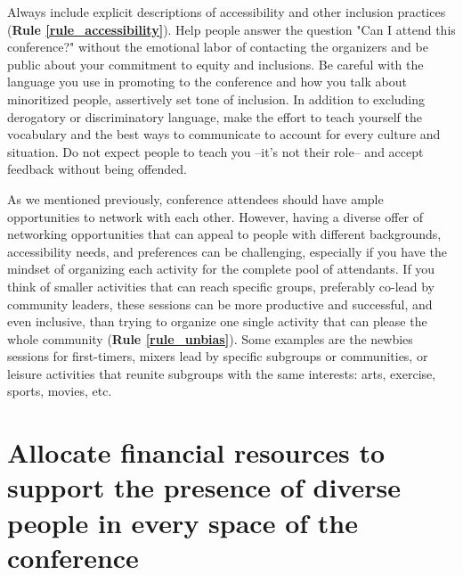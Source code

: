 \documentclass[10pt,letterpaper]{article}
\begin{document}
Always include explicit descriptions of accessibility and other inclusion practices (\textbf{Rule \ref{rule_accessibility}}). Help people answer the question "Can I attend this conference?" without the emotional labor of contacting the organizers and be public about your commitment to equity and inclusions. Be careful with the language you use in promoting to the conference and how you talk about minoritized people, assertively set tone of inclusion. In addition to excluding derogatory or discriminatory language, make the effort to teach yourself the vocabulary and the best ways to communicate to account for every culture and situation. Do not expect people to teach you --it's not their role-- and accept feedback without being offended.


As we mentioned previously, conference attendees should have ample opportunities to network with each other. However, having a diverse offer of networking opportunities that can appeal to people with different backgrounds, accessibility needs, and preferences can be challenging, especially if you have the mindset of organizing each activity for the complete pool of attendants. If you think of smaller activities that can reach specific groups, preferably co-lead by community leaders, these sessions can be more productive and successful, and even inclusive, than trying to organize one single activity that can please the whole community (\textbf{Rule \ref{rule_unbias}}). Some examples are the newbies sessions for first-timers, mixers lead by specific subgroups or communities, or leisure activities that reunite subgroups with the same interests: arts, exercise, sports, movies, etc.







\section{Allocate financial resources to support the presence of diverse people in every space of the conference
}
\label{rule_financial}
\end{document}
